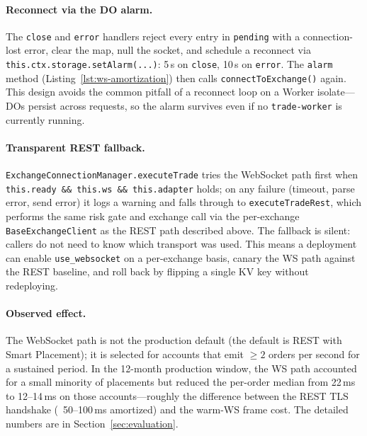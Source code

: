 \paragraph{Reconnect via the DO alarm.}
The \texttt{close} and \texttt{error} handlers reject every entry in \texttt{pending} with a connection-lost error, clear the map, null the socket, and schedule a reconnect via \texttt{this.ctx.storage.setAlarm(...)}: 5\,s on \texttt{close}, 10\,s on \texttt{error}. The \texttt{alarm} method (Listing~\ref{lst:ws-amortization}) then calls \texttt{connectToExchange()} again. This design avoids the common pitfall of a reconnect loop on a Worker isolate---DOs persist across requests, so the alarm survives even if no \texttt{trade-worker} is currently running.

\paragraph{Transparent REST fallback.}
\texttt{ExchangeConnectionManager.executeTrade} tries the WebSocket path first when \texttt{this.ready \&\& this.ws \&\& this.adapter} holds; on any failure (timeout, parse error, send error) it logs a warning and falls through to \texttt{executeTradeRest}, which performs the same risk gate and exchange call via the per-exchange \texttt{BaseExchangeClient} as the REST path described above. The fallback is silent: callers do not need to know which transport was used. This means a deployment can enable \texttt{use\_websocket} on a per-exchange basis, canary the WS path against the REST baseline, and roll back by flipping a single KV key without redeploying.

\paragraph{Observed effect.}
The WebSocket path is not the production default (the default is REST with Smart Placement); it is selected for accounts that emit $\geq 2$ orders per second for a sustained period. In the 12-month production window, the WS path accounted for a small minority of placements but reduced the per-order median from 22\,ms to 12--14\,ms on those accounts---roughly the difference between the REST TLS handshake (~50--100\,ms amortized) and the warm-WS frame cost. The detailed numbers are in Section~\ref{sec:evaluation}.


